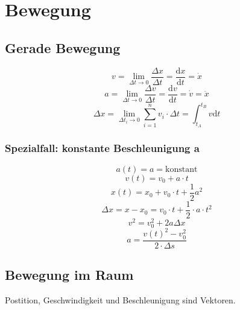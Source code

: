 



\chapter{Bewegung}

\section{Gerade Bewegung}

\[v=\lim\limits_{\Delta t \rightarrow 0}{\frac{\Delta x}{\Delta t}}=\frac{\mathrm{d}x}{\mathrm{d}t}=\dot{x}\]
\[a=\lim\limits_{\Delta t \rightarrow 0}{\frac{\Delta v}{\Delta t}}=\frac{\mathrm{d}v}{\mathrm{d}t}=\dot{v}=\ddot{x}\]
\[\Delta x=\lim\limits_{\Delta t_i \rightarrow 0}{\sum^{n}_{i=1}v_i\cdot\Delta t}=\int_{t_A}^{t_B}v\mathrm{d}t\]

\subsection{Spezialfall: konstante Beschleunigung a}

\[a(t)=a=\mathrm{konstant}\]
\[v(t)=v_0+a\cdot t\]
\[x(t)=x_0+v_0\cdot t+\frac{1}{2}a^{2}\]
\[\Delta x=x-x_0=v_0\cdot t+\frac{1}{2}\cdot a\cdot t^2\]
\[v^2=v_{0}^{2}+2a\Delta x\]
\[a=\frac{v(t)^2-v_0^2}{2\cdot\Delta s}\]

\section{Bewegung im Raum}
Postition, Geschwindigkeit und Beschleunigung sind Vektoren.\\

